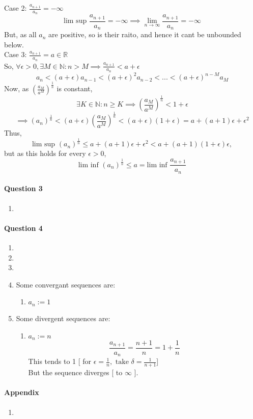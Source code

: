 \documentclass[20pt]{extarticle} %
\begin{document}
\begin{enumerate}[label=\Roman*]
		Case 2:  $ \frac{a_{n+1}}{a_n}= -\infty $\\
		\[ \text{lim sup }  \frac{a_{n+1}}{a_n}= -\infty \implies \lim_{n \to \infty} \frac{a_{n+1}}{a_n} = -\infty\]
		But, as all $a_n$ are positive, so is their raito, and hence it cant be unbounded below. \\

		Case 3:  $ \frac{a_{n+1}}{a_n}= a \in \mathbb{R} $\\
		So, $ \forall \epsilon > 0,  \exists M \in \mathbb{N}: n > M \implies \frac{a_{n+1}}{a_n} < a+\epsilon$
		\[ a_n<(a+\epsilon) a_{n-1}<(a+\epsilon)^2 a_{n-2}<...<(a+\epsilon)^{n-M} a_M \]
		Now, as $(\frac{a_M}{a^M})^{ \frac{1}{n} }$ is constant,
		\[   	\exists K \in \mathbb{N}: n \geq K \implies  (\frac{a_M}{a^M})^{ \frac{1}{n} } <1+\epsilon\]
		\[ \implies (a_n)^ \frac{1}{n}<(a+ \epsilon) (\frac{a_M}{a^M})^{ \frac{1}{n} } < (a+\epsilon)(1+\epsilon)=a+(a+1)\epsilon + \epsilon^2 \]
		Thus,
		\[\text{lim sup }(a_n)^ \frac{1}{n} \leq a+(a+1) \epsilon + \epsilon^2<a+(a+1)(1+\epsilon)\epsilon, \]
	but as this holds for every $\epsilon>0$,
		\[ \text{lim inf }(a_n)^ \frac{1}{n} \leq a= \text{lim inf } \frac{a_{n+1}}{a_n}  \]

\end{enumerate}

\paragraph{Question 3}
\begin{enumerate}[label=\Roman*]
	\item
\end{enumerate}

\paragraph{Question 4}
\begin{enumerate}
	\item
	\item
	\item
	\item Some convergant sequences are:
		\begin{enumerate}
			\item	$a_n:=1$
		\end{enumerate}
	\item Some divergent sequences are: \begin{enumerate}
		\item	$a_n := n$
			\[\frac{  a_{n+1} }{  a_n  }= \frac{n+1}{n}=1+ \frac{1}{n} \]
			This tends to 1 [ for $ \epsilon= \frac{1}{n} , \text{ take } \delta = \frac{1}{n+1}   $]\\
			But the sequence diverges [ to $\infty$  ].
	\end{enumerate}
\end{enumerate}

\paragraph{Appendix}
\begin{enumerate}
	\item {}
\end{enumerate}
\end{document}
